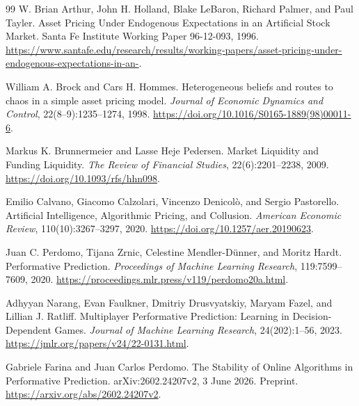 \documentclass[11pt,a4paper]{article}
\theoremstyle{definition}
\theoremstyle{remark}
\begin{document}
\begingroup
\small
\setlength{\bibsep}{2pt}
\begin{thebibliography}{99}
W. Brian Arthur, John H. Holland, Blake LeBaron, Richard Palmer, and Paul Tayler.
\newblock Asset Pricing Under Endogenous Expectations in an Artificial Stock Market.
\newblock Santa Fe Institute Working Paper 96-12-093, 1996.
\newblock \url{https://www.santafe.edu/research/results/working-papers/asset-pricing-under-endogenous-expectations-in-an-}.

William A. Brock and Cars H. Hommes.
\newblock Heterogeneous beliefs and routes to chaos in a simple asset pricing model.
\newblock \emph{Journal of Economic Dynamics and Control}, 22(8--9):1235--1274, 1998.
\newblock \url{https://doi.org/10.1016/S0165-1889(98)00011-6}.

Markus K. Brunnermeier and Lasse Heje Pedersen.
\newblock Market Liquidity and Funding Liquidity.
\newblock \emph{The Review of Financial Studies}, 22(6):2201--2238, 2009.
\newblock \url{https://doi.org/10.1093/rfs/hhn098}.

Emilio Calvano, Giacomo Calzolari, Vincenzo Denicol\`o, and Sergio Pastorello.
\newblock Artificial Intelligence, Algorithmic Pricing, and Collusion.
\newblock \emph{American Economic Review}, 110(10):3267--3297, 2020.
\newblock \url{https://doi.org/10.1257/aer.20190623}.

Juan C. Perdomo, Tijana Zrnic, Celestine Mendler-D\"unner, and Moritz Hardt.
\newblock Performative Prediction.
\newblock \emph{Proceedings of Machine Learning Research}, 119:7599--7609, 2020.
\newblock \url{https://proceedings.mlr.press/v119/perdomo20a.html}.

Adhyyan Narang, Evan Faulkner, Dmitriy Drusvyatskiy, Maryam Fazel, and Lillian J. Ratliff.
\newblock Multiplayer Performative Prediction: Learning in Decision-Dependent Games.
\newblock \emph{Journal of Machine Learning Research}, 24(202):1--56, 2023.
\newblock \url{https://jmlr.org/papers/v24/22-0131.html}.

Gabriele Farina and Juan Carlos Perdomo.
\newblock The Stability of Online Algorithms in Performative Prediction.
\newblock arXiv:2602.24207v2, 3 June 2026. Preprint.
\newblock \url{https://arxiv.org/abs/2602.24207v2}.


\end{thebibliography}
\end{document}
